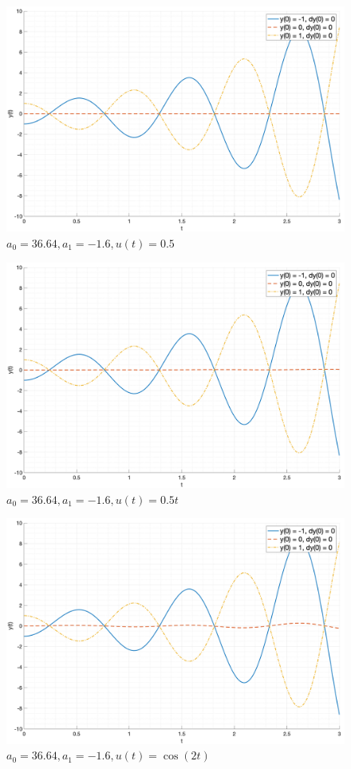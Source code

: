 \begin{figure}[ht!]
    \centering
    \includegraphics[width=\textwidth]{media/plots/case3_input1.png}
    \caption{$a_0 = 36.64, a_1 = -1.6, u(t) = 0.5$}
    \label{fig:case3_input1}
\end{figure}
\begin{figure}[ht!]
    \centering
    \includegraphics[width=\textwidth]{media/plots/case3_input2.png}
    \caption{$a_0 = 36.64, a_1 = -1.6, u(t) = 0.5t$}
    \label{fig:case3_input2}
\end{figure}
\begin{figure}[ht!]
    \centering
    \includegraphics[width=\textwidth]{media/plots/case3_input3.png}
    \caption{$a_0 = 36.64, a_1 = -1.6, u(t) = \cos(2t)$}
    \label{fig:case_3_input_3}
\end{figure}

